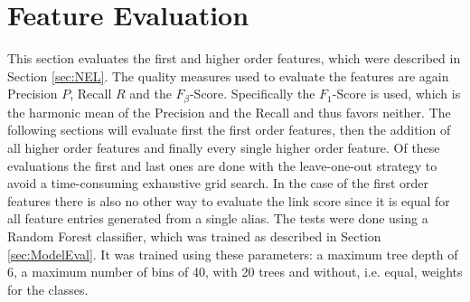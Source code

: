 \section{Feature Evaluation}
\label{sec:FeatureEval}
This section evaluates the first and higher order features, which were described in Section \ref{sec:NEL}. The quality measures used to evaluate the features are again Precision $P$, Recall $R$ and the $F_{\beta}$-Score. Specifically the $F_1$-Score is used, which is the harmonic mean of the Precision and the Recall and thus favors neither. The following sections will evaluate first the first order features, then the addition of all higher order features and finally every single higher order feature. Of these evaluations the first and last ones are done with the leave-one-out strategy to avoid a time-consuming exhaustive grid search. In the case of the first order features there is also no other way to evaluate the link score since it is equal for all feature entries generated from a single alias. The tests were done using a Random Forest classifier, which was trained as described in Section \ref{sec:ModelEval}. It was trained using these parameters: a maximum tree depth of 6, a maximum number of bins of 40, with 20 trees and without, i.e. equal, weights for the classes.

